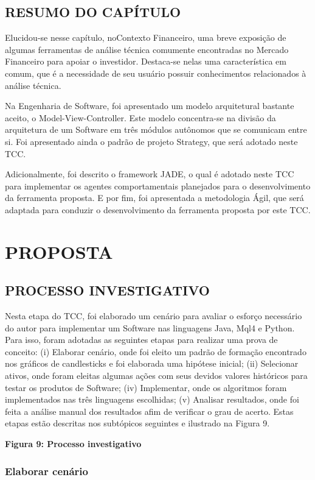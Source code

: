 \section{RESUMO DO CAPÍTULO}

Elucidou-se nesse capítulo, noContexto Financeiro, uma breve exposição de algumas ferramentas de análise técnica comumente encontradas no Mercado Financeiro para apoiar o investidor. Destaca-se nelas uma característica em comum, que é a necessidade de seu usuário possuir conhecimentos relacionados à análise técnica. 

Na Engenharia de Software, foi apresentado um modelo arquitetural bastante aceito, o Model-View-Controller. Este modelo concentra-se na divisão da arquitetura de um Software em três módulos autônomos que se comunicam entre si. Foi apresentado ainda o padrão de projeto Strategy, que será adotado neste TCC. 

Adicionalmente, foi descrito o framework JADE, o qual é adotado neste TCC para implementar os agentes comportamentais planejados para o desenvolvimento da ferramenta proposta. E por fim, foi apresentada a metodologia Ágil, que será adaptada para conduzir o desenvolvimento da ferramenta proposta por este TCC.


\chapter[PROPOSTA]{PROPOSTA}
\section{PROCESSO INVESTIGATIVO}
Nesta etapa do TCC, foi elaborado um cenário para avaliar o esforço necessário do autor para implementar um Software nas linguagens Java, Mql4 e Python. Para isso, foram adotadas as seguintes etapas para realizar uma prova de conceito: (i) Elaborar cenário, onde foi eleito um padrão de formação encontrado nos gráficos de candlesticks e foi elaborada uma hipótese inicial; (ii) Selecionar  ativos, onde foram eleitas algumas ações com seus devidos valores históricos para testar os produtos de  Software; (iv) Implementar, onde os algoritmos foram implementados nas três linguagens escolhidas; (v) Analisar resultados, onde foi feita a análise manual dos resultados afim de verificar o grau de acerto. Estas etapas estão descritas nos subtópicos seguintes e ilustrado na Figura 9.

\textbf{Figura 9: Processo investigativo}

\subsection{Elaborar cenário}

